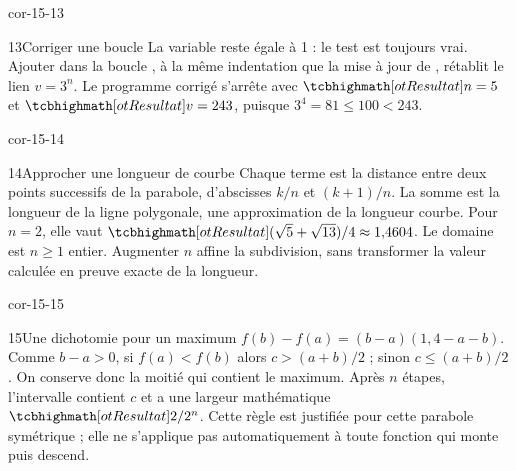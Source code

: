 \begin{blocLivre}{cor-15-13}
\begin{corrige}{13}{Corriger une boucle}
La variable  reste égale à 1 : le test est toujours vrai. Ajouter dans la boucle , à la même indentation que la mise à jour de , rétablit le lien $v=3^n$. Le programme corrigé s’arrête avec $\res{n=5}$ et $\res{v=243}$, puisque $3^4=81\le100<243$.
\end{corrige}
\end{blocLivre}
\begin{blocLivre}{cor-15-14}
\begin{corrige}{14}{Approcher une longueur de courbe}
Chaque terme est la distance entre deux points successifs de la parabole, d’abscisses $k/n$ et $(k+1)/n$. La somme est la longueur de la ligne polygonale, une approximation de la longueur courbe. Pour $n=2$, elle vaut $\res{(\sqrt5+\sqrt{13})/4\approx1{,}4604}$. Le domaine est $n\ge1$ entier. Augmenter $n$ affine la subdivision, sans transformer la valeur calculée en preuve exacte de la longueur.
\label{fig-cor-15-14}
\end{corrige}
\end{blocLivre}
\begin{blocLivre}{cor-15-15}
\begin{corrige}{15}{Une dichotomie pour un maximum}
$f(b)-f(a)=(b-a)(1{,}4-a-b)$. Comme $b-a>0$, si $f(a)<f(b)$ alors $c>(a+b)/2$ ; sinon $c\le(a+b)/2$. On conserve donc la moitié qui contient le maximum. Après $n$ étapes, l’intervalle contient $c$ et a une largeur mathématique $\res{2/2^n}$. Cette règle est justifiée pour cette parabole symétrique ; elle ne s’applique pas automatiquement à toute fonction qui monte puis descend.
\end{corrige}
\end{blocLivre}
